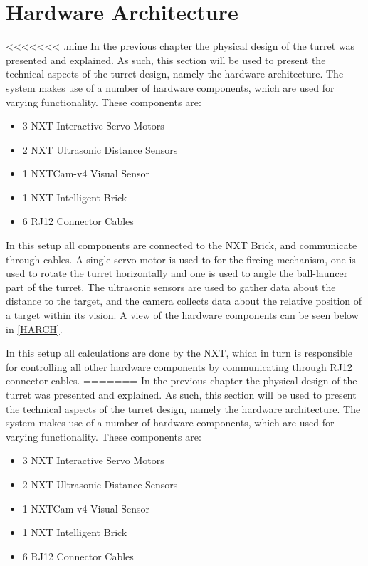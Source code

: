 \section{Hardware Architecture}
<<<<<<< .mine
In the previous chapter the physical design of the turret was presented and
explained. As such, this section will be used to present the technical aspects
of the turret design, namely the hardware architecture. The \name system makes
use of a number of hardware components, which are used for varying
functionality. These components are:

\begin{itemize}
  \item 3 NXT Interactive Servo Motors
  \item 2 NXT Ultrasonic Distance Sensors
  \item 1 NXTCam-v4 Visual Sensor
  \item 1 NXT Intelligent Brick
  \item 6 RJ12 Connector Cables
\end{itemize}

In this setup all components are connected to the NXT Brick, and communicate
through cables. A single servo motor is used to for the fireing mechanism, one
is used to rotate the turret horizontally and one is used to angle the
ball-launcer part of the turret. The ultrasonic sensors are used to gather data
about the distance to the target, and the camera collects data about the
relative position of a target within its vision. A view of the hardware
components can be seen below in \autoref{HARCH}.


In this setup all calculations are done by the NXT, which in turn is responsible
for controlling all other hardware components by communicating through RJ12
connector cables.
=======
In the previous chapter the physical design of the turret was presented and
explained. As such, this section will be used to present the technical aspects
of the turret design, namely the hardware architecture. The \name system makes
use of a number of hardware components, which are used for varying
functionality. These components are:

\begin{itemize}
  \item 3 NXT Interactive Servo Motors
  \item 2 NXT Ultrasonic Distance Sensors
  \item 1 NXTCam-v4 Visual Sensor
  \item 1 NXT Intelligent Brick
  \item 6 RJ12 Connector Cables
\end{itemize}

